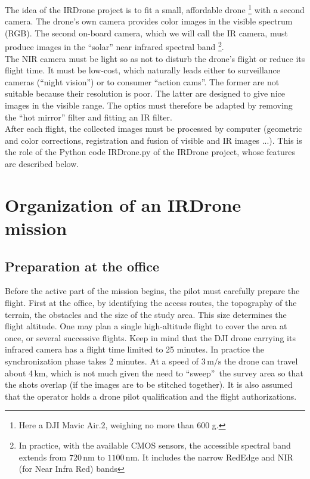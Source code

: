 \documentclass[a4paper,11pt]{report}
\begin{document}
The idea of the \textsf{IRDrone} project is to fit a small,  affordable drone
\footnote{Here a DJI Mavic Air.2, weighing no more than 600 g.} with a second  camera. The drone's own camera provides color images in the visible spectrum (RGB). The second on-board camera, which we will call the IR camera, must produce images in the ``solar'' near infrared spectral band
\footnote{In practice, with the available CMOS sensors, the accessible spectral band extends from $720 \,\mathrm{nm}$ to $1100\,\mathrm{nm}$. It includes the narrow RedEdge and NIR (for Near Infra Red) bands}.\\

The NIR camera must be light so as not to disturb the drone's flight or reduce its flight time. It must be low-cost, which naturally leads either to surveillance cameras (``night vision'') or to consumer ``action cams''. The former are not suitable because their resolution is poor. The latter are designed to give nice images in the visible range. The optics must therefore be adapted by removing the ``hot mirror'' filter and fitting an IR filter.  \\


After each flight, the collected images must be processed by computer (geometric and color corrections, registration and fusion of visible and IR images ...). This is the role of the Python code  IRDrone.py of the \textsf{IRDrone} project, whose features are  described below.


\section{Organization of an IRDrone mission}

\subsection{Preparation at the office}

Before the active part of the mission begins, the pilot must carefully prepare the flight.
First at the office, by identifying the access routes, the topography of the terrain, the obstacles and the size of the study area.
This size determines the flight altitude. One may plan a single high-altitude flight to cover the area at once, or several successive flights. Keep in mind that the DJI drone carrying its infrared camera has a flight time limited to 25 minutes.
In practice the synchronization phase takes 2 minutes. At a speed of $3\,\mathrm{m/s}$ the drone can travel about 4\,km, which is not much given the need to ``sweep''~the survey area so that the shots overlap (if the images are to be stitched together).
It is also assumed that the operator holds a drone pilot qualification and the flight authorizations.
\end{document}
